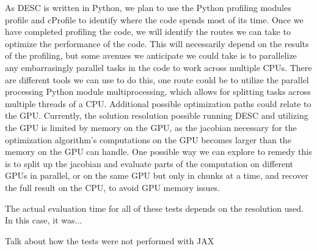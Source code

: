 \documentclass{article}
\begin{document}
As DESC is written in Python, we plan to use the Python profiling modules profile and cProfile to identify where the code spends most of its time. Once we have completed profiling the code, we will identify the routes we can take to optimize the performance of the code. This will necessarily depend on the results of the profiling, but some avenues we anticipate we could take is to parallelize any embarrasingly parallel tasks in the code to work across multiple CPUs. There are different tools we can use to do this, one route could be to utilize the parallel processing Python module multiprocessing, which allows for splitting tasks across multiple threads of a CPU. Additional possible optimization paths could relate to the GPU. Currently, the solution resolution possible running DESC and utilizing the GPU is limited by memory on the GPU, as the jacobian necessary for the optimization algorithm's computations on the GPU becomes larger than the memory on the GPU can handle. One possible way we can explore to remedy this is to split up the jacobian and evaluate parts of the computation on different GPUs in parallel, or on the same GPU but only in chunks at a time, and recover the full result on the CPU, to avoid GPU memory issues.


The actual evaluation time for all of these tests depends on the resolution used.  In this case, it was...

Talk about how the tests were not performed with JAX
\end{document}
